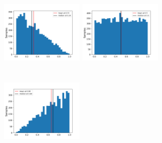 \documentclass[a4paper,11pt]{article}
\theoremstyle{mytheor}
\begin{document}
    \begin{figure}[H]
    \centering
    \begin{minipage}{.32\textwidth}
      \centering
      \includegraphics[width=4cm, height=4cm]{sampling/beta_samples_(1,2)c.png}
    \end{minipage}%
    \begin{minipage}{.32\textwidth}
      \centering
      \includegraphics[width=4cm, height=4cm]{sampling/beta_samples_(1,1)c.png}
    \end{minipage}%
    \begin{minipage}{.32\textwidth}
      \centering
      \includegraphics[width=4cm, height=4cm]{sampling/beta_samples_(2,1)c.png}
    \end{minipage}%
    \par
    \medskip
    \noindent
    \begin{minipage}[t]{.32\textwidth}
      \centering
    \end{minipage}%
    \begin{minipage}[t]{.32\textwidth}
      \centering
    \end{minipage}
    \begin{minipage}[t]{.32\textwidth}
      \centering
    \end{minipage}%
    \end{figure}
    
\end{document}
